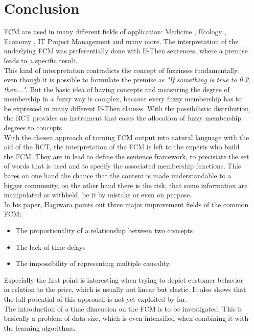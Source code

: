 \documentclass[conference]{IEEEtran}
\begin{document}
\section{Conclusion}
\label{sec:conclusion}
FCM are used in many different fields of application: Medicine \cite{georgopoulos2003}, Ecology \cite{ozesmi2004}, Economy \cite{carvalho2004}, IT Project Management \cite{rodriguez2007} and many more. The interpretation of the underlying FCM was preferentially done with If-Then sentences, where a premise leads to a specific result.\\
This kind of interpretation contradicts the concept of fuzziness fundamentally, even though it is possible to formulate the premise as \emph{"If something is true to 0.2, then..."}. But the basic idea of having concepts and measuring the degree of membership in a fuzzy way is complex, because every fuzzy membership has to be expressed in many different If-Then clauses. With the possibilistic distribution, the RCT provides an instrument that eases the allocation of fuzzy membership degrees to concepts.\\
With the chosen approach of turning FCM output into natural language with the aid of the RCT, the interpretation of the FCM is left to the experts who build the FCM. They are in lead to define the sentence framework, to precisiate the set of words that is used and to specify the associated membership functions. This bares on one hand the chance that the content is made understandable to a bigger community, on the other hand there is the risk, that some information are manipulated or withheld, be it by mistake or even on purpose.\\
In his paper, Hagiwara \cite{hagiwara1992} points out three major improvement fields of the common FCM: 
\begin{itemize}
\item The proportionality of a relationship between two concepts
\item The lack of time delays
\item The impossibility of representing multiple causality. 
\end{itemize}
Especially the first point is interesting when trying to depict customer behavior in relation to the price, which is usually not linear but elastic. It also shows that the full potential of this approach is not yet exploited by far.\\
The introduction of a time dimension on the FCM is to be investigated. This is basically a problem of data size, which is even intensified when combining it with the learning algorithms.\\
\end{document}

